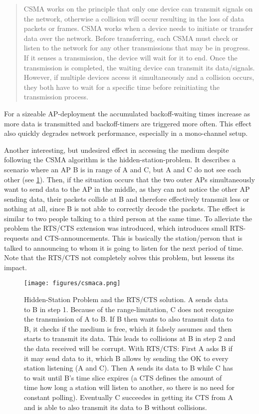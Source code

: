 	\begin{quotation}
	  CSMA works on the principle that only one device can transmit signals on the network, 
	  otherwise a collision will occur resulting in the loss of data packets or frames. 
	  CSMA works when a device needs to initiate or transfer data over the network. 
	  Before transferring, each CSMA must check or listen to the network for any other transmissions that may be in progress. 
	  If it senses a transmission, the device will wait for it to end. Once the transmission is completed, 
	  the waiting device can transmit its data/signals. However, if multiple devices access it simultaneously and a collision occurs, 
	  they both have to wait for a specific time before reinitiating the transmission process. 
	\end{quotation}
	
	For a sizeable \ac{AP}-deployment the accumulated backoff-waiting times increase as more data is transmitted and backoff-timers are triggered more often.
	This effect also quickly degrades network performance, especially in a mono-channel setup.
	
	Another interesting, but undesired effect in accessing the medium despite following the CSMA algorithm is the hidden-station-problem.
	It describes a scenario where an \ac{AP} B is in range of A and C, but A and C do not see each other (see \ref{fig:csmaca}).
	Then, if the situation occurs that the two outer APs simultaneously want to send data to the \ac{AP} in the middle, as they can not notice the 
	other AP sending data, their packets collide at B and therefore effectively transmit less or nothing at all, since B is not able to correctly decode the packets.
	The effect is similar to two people talking to a third person at the same time.
	To alleviate the problem the RTS/CTS extension was introduced, which introduces small \ac{RTS}-requests and \ac{CTS}-announcements. 
	This is basically the station/person that is talked to announcing to whom it is going to listen for the next period of time.
	Note that the RTS/CTS not completely solves this problem, but lessens its impact.
	
	\begin{figure}[th!]
	  \centering
	  \texttt{[image: figures/csmaca.png]}
	  \caption{Hidden-Station Problem and the RTS/CTS solution. A sends data to B in step 1.
	    Because of the range-limitation, C does not recognize the transmission of A to B. 
	    If B then wants to also transmit data to B, it checks if the medium is free, which it falsely assumes
	    and then starts to transmit its data. This leads to collisions at B in step 2 and the data received will be corrupt.
	    With RTS/CTS: First A asks B if it may send data to it, which B allows by sending the OK to every station listening (A and C). 
	    Then A sends its data to B while C has to wait until B's time slice expires (a CTS defines the amount of time how long a station will listen to another, so there is no
	    need for constant polling). Eventually C succeedes in getting its CTS from A and is able to also transmit its data to B without collisions.}
	  \label{fig:csmaca}
	\end{figure}

